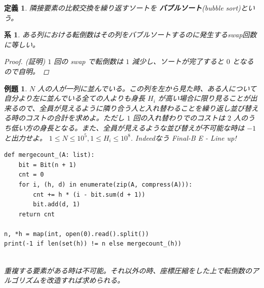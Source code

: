 \documentclass[12pt, a4j]{ltjsarticle}
\newtheorem{defi}[thm]{定義}
\newtheorem{cor}[thm]{系}
\newtheorem{exm}[thm]{例題}
\newcommand*{\SS}{\vspace{1cm}}
\begin{document}
\SS

\begin{defi} 隣接要素の比較交換を繰り返すソートを {\bf バブルソート}(bubble sort)という。
\end{defi}

\SS

\begin{cor} \upshape ある列における転倒数はその列をバブルソートするのに発生するswap回数に等しい。
\begin{proof} (証明) $1$ 回の swap で転倒数は $1$ 減少し、ソートが完了すると $0$ となるので自明。
\end{proof}
\end{cor}

\newpage

\begin{exm}\upshape $N$ 人の人が一列に並んでいる。この列を左から見た時、ある人について自分より左に並んでいる全ての人よりも身長 $H_i$ が高い場合に限り見ることが出来るので、全員が見えるように隣り合う人と入れ替わることを繰り返し並び替える時のコストの合計を求めよ。ただし $1$ 回の入れ替わりでのコストは $2$ 人のうち低い方の身長となる。また、全員が見えるような並び替えが不可能な時は $-1$ と出力せよ。 $1\le N\le10^5, 1\le H_i\le 10^8$. Indeedなう Final-B E - Line up!\\
\begin{lstlisting}
def mergecount_(A: list):
    bit = Bit(n + 1)
    cnt = 0
    for i, (h, d) in enumerate(zip(A, compress(A))):
        cnt += h * (i - bit.sum(d + 1))
        bit.add(d, 1)
    return cnt

n, *h = map(int, open(0).read().split())
print(-1 if len(set(h)) != n else mergecount_(h))
\end{lstlisting}\quad\\
重複する要素がある時は不可能。それ以外の時、座標圧縮をした上で転倒数のアルゴリズムを改造すれば求められる。
\end{exm}

\SS
\end{document}
